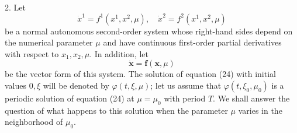 \documentclass[10pt,a5paper]{book}
\theoremstyle{plain}
\theoremstyle{definition}
\theoremstyle{remark}
\begin{document}
2. Let
\[
\dot{x}^{1}=f^{1}\left(x^{1}, x^{2}, \mu\right), \quad \dot{x}^{2}=f^{2}\left(x^{1}, x^{2}, \mu\right)
\]
be a normal autonomous second-order system whose right-hand sides depend on the numerical parameter $\mu$ and have continuous first-order partial derivatives with respect to $x_{1}, x_{2}, \mu$. In addition, let
\begin{equation*}
\dot{\mathbf{x}}=\mathbf{f}(\mathbf{x}, \mu) \tag{24}
\end{equation*}
be the vector form of this system. The solution of equation (24) with initial values $0, \xi$ will be denoted by $\varphi(t, \xi, \mu)$; let us assume that $\varphi\left(t, \xi_{0}, \mu_{0}\right)$ is a periodic solution of equation (24) at $\mu=\mu_{0}$ with period $T$. We shall answer the question of what happens to this solution when the parameter $\mu$ varies in the neighborhood of $\mu_{0}$.
\end{document}

